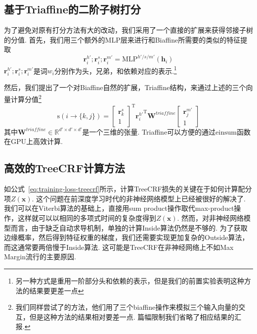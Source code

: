 \subsection{基于Triaffine的二阶子树打分}
为了避免对原有打分方法有大的改动，我们采用了一个直接的扩展来获得邻接子树的分值.
首先，我们用三个额外的MLP层来进行和Biaffine所需要的类似的特征提取
\begin{equation}
  \label{mlp-sib}
  \mathbf{r}_i^{h'}; \mathbf{r}_i^{s}; \mathbf{r}_i^{m'} =\mathrm{MLP}^{h'/s/m'} \left( \mathbf{h}_i \right)
\end{equation}
$\mathbf{r}_i^{h'}; \mathbf{r}_i^{s}; \mathbf{r}_i^{m'}$是词$w_i$分别作为头，兄弟，和依赖对应的表示.\footnote{
  另一种方式是重用一阶部分头和依赖的表示，但是我们的前置实验表明这种方法的结果要更差一点
}

然后，我们提出了一个对Biaffine自然的扩展，Triaffine结构，来通过上述的三个向量计算分值\footnote{
  我们同样尝试了\citet{wang-etal-2019-second}的方法，他们用了三个biaffine操作来模拟三个输入向量的交互，但是这种方法的结果相对要差一点.
  篇幅限制我们省略了相应结果的汇报.
}
\begin{equation} \label{eq:triaffine}
  \mathrm{s}(i\rightarrow \{k,j\}) =
  \left[
    \begin{array}{c}
      \mathbf{r}_{k}^{s} \\
      1
    \end{array}
    \right]^\mathrm{T}
  {\mathbf{r}_{i}^{h'}}^\mathrm{T}
  \mathbf{W}^\textit{triaffine}
  \left[
    \begin{array}{c}
      \mathbf{r}_{j}^{m'} \\
      1
    \end{array}
    \right]
\end{equation}
其中$\mathbf{W}^\textit{triaffine} \in \mathbb{R}^{d' \times d' \times d'}$是一个三维的张量.
Triaffine可以方便的通过$\mathrm{einsum}$函数在GPU上高效计算.

\subsection{高效的TreeCRF计算方法}

如公式~\ref{eq:training-loss-treecrf}所示，计算TreeCRF损失的关键在于如何计算配分项$Z(\boldsymbol{x})$.
这个问题在前深度学习时代的非神经网络模型上已经被很好的解决了.
我们可以在Viterbi算法的基础上，直接用sum product操作取代max-product操作，这样就可以以相同的多项式时间的复杂度得到$Z(\boldsymbol{x})$.
然而，对非神经网络模型而言，由于缺乏自动求导机制，单独的计算Inside算法仍然是不够的.
为了获取边缘概率，然后得到特征权重的梯度，我们还需要实现更加复杂的Outside算法，而这通常要两倍慢于Inside算法.
这可能是TreeCRF在非神经网络上不如Max Margin流行的主要原因.

